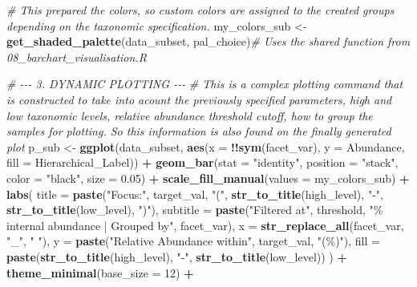 \documentclass[
]{article}
\newenvironment{Shaded}{\begin{snugshade}}{\end{snugshade}}
\newcommand{\AttributeTok}[1]{\textcolor[rgb]{0.13,0.29,0.53}{#1}}
\newcommand{\CommentTok}[1]{\textcolor[rgb]{0.56,0.35,0.01}{\textit{#1}}}
\newcommand{\DecValTok}[1]{\textcolor[rgb]{0.00,0.00,0.81}{#1}}
\newcommand{\FloatTok}[1]{\textcolor[rgb]{0.00,0.00,0.81}{#1}}
\newcommand{\FunctionTok}[1]{\textcolor[rgb]{0.13,0.29,0.53}{\textbf{#1}}}
\newcommand{\NormalTok}[1]{#1}
\newcommand{\OtherTok}[1]{\textcolor[rgb]{0.56,0.35,0.01}{#1}}
\newcommand{\SpecialCharTok}[1]{\textcolor[rgb]{0.81,0.36,0.00}{\textbf{#1}}}
\newcommand{\StringTok}[1]{\textcolor[rgb]{0.31,0.60,0.02}{#1}}
\begin{document}
\begin{Shaded}
\begin{Highlighting}[]
\CommentTok{\# This prepared the colors, so custom colors are assigned to the created groups depending on the taxonomic specification.}
\NormalTok{my\_colors\_sub }\OtherTok{\textless{}{-}} \FunctionTok{get\_shaded\_palette}\NormalTok{(data\_subset, pal\_choice)}\CommentTok{\# Uses the shared function from 08\_barchart\_visualisation.R}

\CommentTok{\# {-}{-}{-} 3. DYNAMIC PLOTTING {-}{-}{-}}
\CommentTok{\# This is a complex plotting command that is constructed to take into acount the previously specified parameters, high and low taxonomic levels, relative abundance threshold cutoff, how to group the samples for plotting. So this information is also found on the finally generated plot}
\NormalTok{p\_sub }\OtherTok{\textless{}{-}} \FunctionTok{ggplot}\NormalTok{(data\_subset, }\FunctionTok{aes}\NormalTok{(}\AttributeTok{x =} \SpecialCharTok{!!}\FunctionTok{sym}\NormalTok{(facet\_var), }\AttributeTok{y =}\NormalTok{ Abundance, }\AttributeTok{fill =}\NormalTok{ Hierarchical\_Label)) }\SpecialCharTok{+}
  \FunctionTok{geom\_bar}\NormalTok{(}\AttributeTok{stat =} \StringTok{"identity"}\NormalTok{, }\AttributeTok{position =} \StringTok{"stack"}\NormalTok{, }\AttributeTok{color =} \StringTok{"black"}\NormalTok{, }\AttributeTok{size =} \FloatTok{0.05}\NormalTok{) }\SpecialCharTok{+}
  \FunctionTok{scale\_fill\_manual}\NormalTok{(}\AttributeTok{values =}\NormalTok{ my\_colors\_sub) }\SpecialCharTok{+}
  \FunctionTok{labs}\NormalTok{(}
    \AttributeTok{title =} \FunctionTok{paste}\NormalTok{(}\StringTok{"Focus:"}\NormalTok{, target\_val, }\StringTok{"("}\NormalTok{, }\FunctionTok{str\_to\_title}\NormalTok{(high\_level), }\StringTok{"{-}"}\NormalTok{, }\FunctionTok{str\_to\_title}\NormalTok{(low\_level), }\StringTok{")"}\NormalTok{),}
    \AttributeTok{subtitle =} \FunctionTok{paste}\NormalTok{(}\StringTok{"Filtered at"}\NormalTok{, threshold, }\StringTok{"\% internal abundance | Grouped by"}\NormalTok{, facet\_var),}
    \AttributeTok{x =} \FunctionTok{str\_replace\_all}\NormalTok{(facet\_var, }\StringTok{"\_"}\NormalTok{, }\StringTok{" "}\NormalTok{),}
    \AttributeTok{y =} \FunctionTok{paste}\NormalTok{(}\StringTok{"Relative Abundance within"}\NormalTok{, target\_val, }\StringTok{"(\%)"}\NormalTok{),}
    \AttributeTok{fill =} \FunctionTok{paste}\NormalTok{(}\FunctionTok{str\_to\_title}\NormalTok{(high\_level), }\StringTok{"{-}"}\NormalTok{, }\FunctionTok{str\_to\_title}\NormalTok{(low\_level))}
\NormalTok{  ) }\SpecialCharTok{+}
  \FunctionTok{theme\_minimal}\NormalTok{(}\AttributeTok{base\_size =} \DecValTok{12}\NormalTok{) }\SpecialCharTok{+}

\end{Highlighting}
\end{Shaded}
\end{document}
